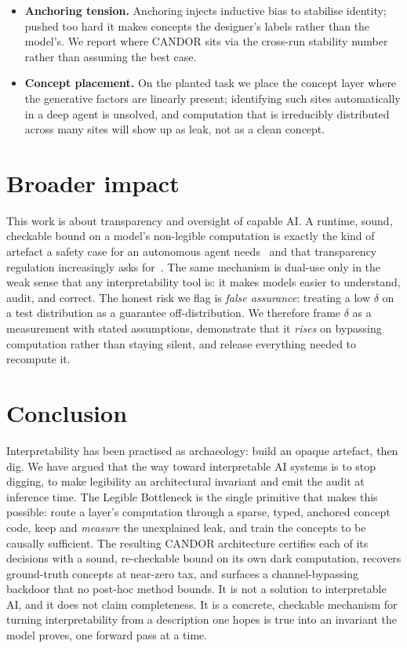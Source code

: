 \documentclass[11pt]{article}
\begin{document}
\begin{itemize}[leftmargin=1.4em,itemsep=1pt]
and a worst-case bound-propagation audit~\citep{xu2020autolirpa} are the natural
complements.
\item \textbf{Anchoring tension.} Anchoring injects inductive bias to stabilise identity;
pushed too hard it makes concepts the designer's labels rather than the model's. We report
where CANDOR sits via the cross-run stability number rather than assuming the best case.
\item \textbf{Concept placement.} On the planted task we place the concept layer where
the generative factors are linearly present; identifying such sites automatically in a
deep agent is unsolved, and computation that is irreducibly distributed across many
sites will show up as leak, not as a clean concept.
\end{itemize}

\section{Broader impact}
This work is about transparency and oversight of capable AI. A runtime, sound, checkable
bound on a model's non-legible computation is exactly the kind of artefact a safety case
for an autonomous agent needs~\citep{clymer2024safetycases,amodei2025urgency} and that
transparency regulation increasingly asks for~\citep{euaiact2024}. The same mechanism is
dual-use only in the weak sense that any interpretability tool is: it makes models easier
to understand, audit, and correct. The honest risk we flag is \emph{false assurance}:
treating a low $\delta$ on a test distribution as a guarantee off-distribution. We
therefore frame $\delta$ as a measurement with stated assumptions, demonstrate that it
\emph{rises} on bypassing computation rather than staying silent, and release everything
needed to recompute it.

\section{Conclusion}
Interpretability has been practised as archaeology: build an opaque artefact, then dig.
We have argued that the way toward interpretable AI systems is to stop digging, to make
legibility an architectural invariant and emit the audit at inference time. The Legible
Bottleneck is the single primitive that makes this possible: route a layer's computation
through a sparse, typed, anchored concept code, keep and \emph{measure} the unexplained
leak, and train the concepts to be causally sufficient. The resulting CANDOR
architecture certifies each of its decisions with a sound, re-checkable bound on its own
dark computation, recovers ground-truth concepts at near-zero tax, and surfaces a
channel-bypassing backdoor that no post-hoc method bounds. It is not a solution to
interpretable AI, and it does not claim completeness. It is a concrete, checkable
mechanism for turning interpretability from a description one hopes is true into an
invariant the model proves, one forward pass at a time.
\end{document}
